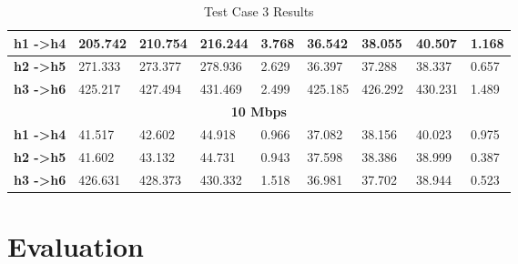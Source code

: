 \begin{table}[h!]
\begin{tabular}{l|l|l|l|l|l|l|l|l|}
\multicolumn{1}{|l|}{\textbf{h1 -\textgreater h4}} & 205.742                           & 210.754                           & 216.244                           & 3.768                              & 36.542                            & 38.055                            & 40.507                            & 1.168                              \\ \hline
\multicolumn{1}{|l|}{\textbf{h2 -\textgreater h5}} & 271.333                           & 273.377                           & 278.936                           & 2.629                              & 36.397                            & 37.288                            & 38.337                            & 0.657                              \\ \hline
\multicolumn{1}{|l|}{\textbf{h3 -\textgreater h6}} & 425.217                           & 427.494                           & 431.469                           & 2.499                              & 425.185                           & 426.292                           & 430.231                           & 1.489                              \\ \hline
\multicolumn{9}{|c|}{\textbf{10 Mbps}}                                                                                                                                                                                                                                                                                                               \\ \hline
\multicolumn{1}{|l|}{\textbf{h1 -\textgreater h4}} & 41.517                            & 42.602                            & 44.918                            & 0.966                              & 37.082                            & 38.156                            & 40.023                            & 0.975                              \\ \hline
\multicolumn{1}{|l|}{\textbf{h2 -\textgreater h5}} & 41.602                            & 43.132                            & 44.731                            & 0.943                              & 37.598                            & 38.386                            & 38.999                            & 0.387                              \\ \hline
\multicolumn{1}{|l|}{\textbf{h3 -\textgreater h6}} & 426.631                           & 428.373                           & 430.332                           & 1.518                              & 36.981                            & 37.702                            & 38.944                            & 0.523                              \\ \hline
\end{tabular}
\caption{Test Case 3 Results}
\label{table:test3}
\end{table}

\section{Evaluation}
\lipsum[1-1]